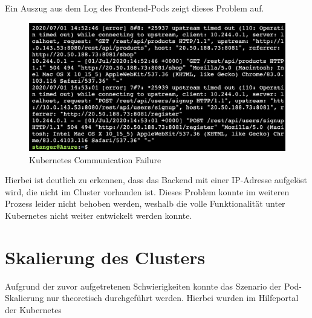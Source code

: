 Ein Auszug aus dem Log des Frontend-Pods zeigt dieses Problem auf.

\begin{figure}[h!]
 \centering
 \includegraphics[width=150mm]{images/kubernetes-failure.png}
 \caption{Kubernetes Communication Failure}
 \label{fig:kubernetes-failure}
\end{figure}

Hierbei ist deutlich zu erkennen, dass das Backend mit einer IP-Adresse aufgelöst wird, die nicht im Cluster vorhanden ist. Dieses Problem konnte im weiteren Prozess leider nicht behoben werden, weshalb die volle Funktionalität unter Kubernetes nicht weiter entwickelt werden konnte.

\section{Skalierung des Clusters}
Aufgrund der zuvor aufgetretenen Schwierigkeiten konnte das Szenario der Pod-Skalierung nur theoretisch durchgeführt werden. Hierbei wurden im Hilfeportal der Kubernetes 